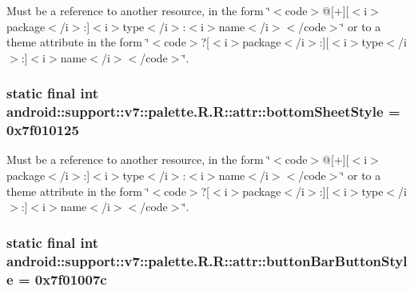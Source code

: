 Must be a reference to another resource, in the form \char`\"{}$<$code$>$@\mbox{[}+\mbox{]}\mbox{[}$<$i$>$package$<$/i$>$:\mbox{]}$<$i$>$type$<$/i$>$:$<$i$>$name$<$/i$>$$<$/code$>$\char`\"{} or to a theme attribute in the form \char`\"{}$<$code$>$?\mbox{[}$<$i$>$package$<$/i$>$:\mbox{]}\mbox{[}$<$i$>$type$<$/i$>$:\mbox{]}$<$i$>$name$<$/i$>$$<$/code$>$\char`\"{}. \hypertarget{classandroid_1_1support_1_1v7_1_1palette_1_1_r_1_1attr_b415e79d81c8a0a41bca104334534503}{
\subsubsection[{bottomSheetStyle}]{\setlength{\rightskip}{0pt plus 5cm}static final int android::support::v7::palette.R.R::attr::bottomSheetStyle = 0x7f010125}}
\label{classandroid_1_1support_1_1v7_1_1palette_1_1_r_1_1attr_b415e79d81c8a0a41bca104334534503}


Must be a reference to another resource, in the form \char`\"{}$<$code$>$@\mbox{[}+\mbox{]}\mbox{[}$<$i$>$package$<$/i$>$:\mbox{]}$<$i$>$type$<$/i$>$:$<$i$>$name$<$/i$>$$<$/code$>$\char`\"{} or to a theme attribute in the form \char`\"{}$<$code$>$?\mbox{[}$<$i$>$package$<$/i$>$:\mbox{]}\mbox{[}$<$i$>$type$<$/i$>$:\mbox{]}$<$i$>$name$<$/i$>$$<$/code$>$\char`\"{}. \hypertarget{classandroid_1_1support_1_1v7_1_1palette_1_1_r_1_1attr_dc1f7baaef4737942e7f47f2c6fd937f}{
\subsubsection[{buttonBarButtonStyle}]{\setlength{\rightskip}{0pt plus 5cm}static final int android::support::v7::palette.R.R::attr::buttonBarButtonStyle = 0x7f01007c}}
\label{classandroid_1_1support_1_1v7_1_1palette_1_1_r_1_1attr_dc1f7baaef4737942e7f47f2c6fd937f}


